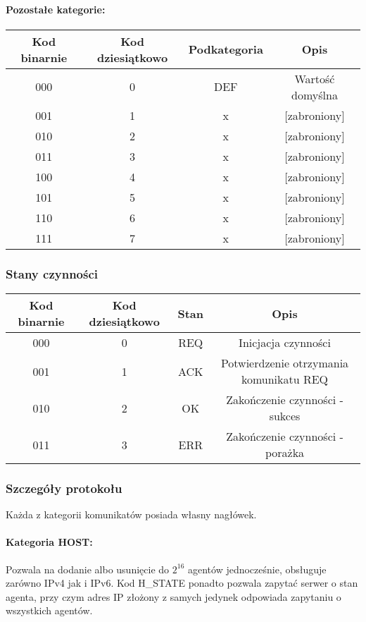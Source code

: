 \documentclass[10pt,a4paper]{article}
\begin{document}
				\paragraph{Pozostałe kategorie:\\}
				
				\begin{tabular}{ c | c | c | c }
				    \textbf{Kod binarnie} & \textbf{Kod dziesiątkowo} & \textbf{Podkategoria} & \textbf{Opis} \\
				    \hline
				    000 & 0 & DEF & Wartość domyślna \\
				    001 & 1 & x & [zabroniony] \\
				    010 & 2 & x & [zabroniony] \\
				    011 & 3 & x & [zabroniony] \\
				    100 & 4 & x & [zabroniony] \\
				    101 & 5 & x & [zabroniony] \\
				    110 & 6 & x & [zabroniony] \\
				    111 & 7 & x & [zabroniony] \\
				\end{tabular}
		        
	        \subsubsection{Stany czynności}
		        \begin{tabular}{ c | c | c | c }
				    \textbf{Kod binarnie} & \textbf{Kod dziesiątkowo} & \textbf{Stan} & \textbf{Opis} \\
				    \hline
				    000 & 0 & REQ & Inicjacja czynności \\
				    001 & 1 & ACK & Potwierdzenie otrzymania komunikatu REQ \\
				    010 & 2 & OK & Zakończenie czynności - sukces \\
				    011 & 3 & ERR & Zakończenie czynności - porażka \\
				\end{tabular}
				
        \subsubsection{Szczegóły protokołu}
            Każda z kategorii komunikatów posiada własny nagłówek.\\
            
            \paragraph{Kategoria HOST:\\}
            Pozwala na dodanie albo usunięcie do $2^{16}$ agentów jednocześnie, obsługuje zarówno IPv4 jak i IPv6. Kod H\_STATE ponadto pozwala zapytać serwer o stan agenta, przy czym adres IP złożony z samych jedynek odpowiada zapytaniu o wszystkich agentów.
            
\end{document}
